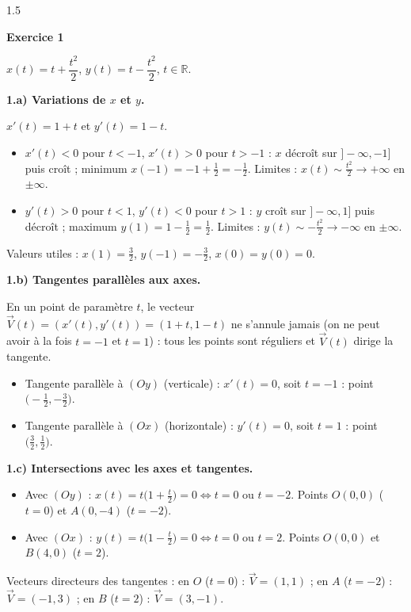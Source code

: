 \documentclass[12pt]{article}
\begin{document}
\begin{spacing}{1.5}

\textbf{Exercice 1}

$x(t)=t+\dfrac{t^2}{2}$, \quad $y(t)=t-\dfrac{t^2}{2}$, \quad $t\in\mathbb{R}$.

\textbf{1.a) Variations de $x$ et $y$.}

$x'(t)=1+t$ et $y'(t)=1-t$.
\begin{itemize}
\item $x'(t)<0$ pour $t<-1$, $x'(t)>0$ pour $t>-1$ : $x$ décroît sur $]-\infty,-1]$ puis croît ; minimum $x(-1)=-1+\frac12=-\frac12$. Limites : $x(t)\sim\frac{t^2}{2}\to+\infty$ en $\pm\infty$.
\item $y'(t)>0$ pour $t<1$, $y'(t)<0$ pour $t>1$ : $y$ croît sur $]-\infty,1]$ puis décroît ; maximum $y(1)=1-\frac12=\frac12$. Limites : $y(t)\sim-\frac{t^2}{2}\to-\infty$ en $\pm\infty$.
\end{itemize}
Valeurs utiles : $x(1)=\frac32$, $y(-1)=-\frac32$, $x(0)=y(0)=0$.

\begin{center}
\end{center}

\textbf{1.b) Tangentes parallèles aux axes.}

En un point de paramètre $t$, le vecteur $\vec V(t)=(x'(t),y'(t))=(1+t,1-t)$ ne s'annule jamais (on ne peut avoir à la fois $t=-1$ et $t=1$) : tous les points sont réguliers et $\vec V(t)$ dirige la tangente.
\begin{itemize}
\item Tangente parallèle à $(Oy)$ (verticale) : $x'(t)=0$, soit $t=-1$ : point $\big(-\frac12,-\frac32\big)$.
\item Tangente parallèle à $(Ox)$ (horizontale) : $y'(t)=0$, soit $t=1$ : point $\big(\frac32,\frac12\big)$.
\end{itemize}

\textbf{1.c) Intersections avec les axes et tangentes.}
\begin{itemize}
\item Avec $(Oy)$ : $x(t)=t\big(1+\frac t2\big)=0\iff t=0$ ou $t=-2$. Points $O(0,0)$ ($t=0$) et $A(0,-4)$ ($t=-2$).
\item Avec $(Ox)$ : $y(t)=t\big(1-\frac t2\big)=0\iff t=0$ ou $t=2$. Points $O(0,0)$ et $B(4,0)$ ($t=2$).
\end{itemize}
Vecteurs directeurs des tangentes : en $O$ ($t=0$) : $\vec V=(1,1)$ ; en $A$ ($t=-2$) : $\vec V=(-1,3)$ ; en $B$ ($t=2$) : $\vec V=(3,-1)$.


\end{spacing}
\end{document}
